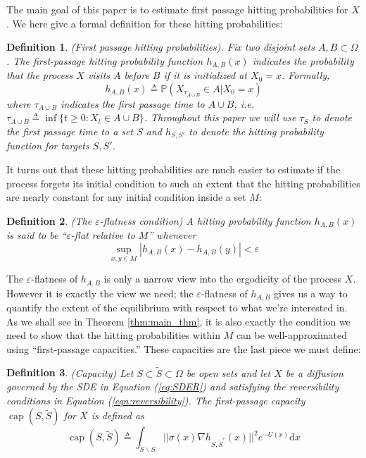 \documentclass[12pt, nofootinbib,english, amsmath, amssymb, aps, priprint, graphicx,floatfix,draft]{revtex4-1}
\newtheorem{definition}{Definition}
\theoremstyle{plain}
\theoremstyle{definition}
\theoremstyle{plain}
\begin{document}
The main goal of this paper is to estimate first passage hitting probabilities for $X$.  We here give a formal definition for these hitting probabilities:

\begin{definition}(First passage hitting probabilities).  Fix two disjoint sets $A,B\subset \Omega$.  The first-passage hitting probability function $h_{A,B}(x)$ indicates the probability that the process $X$ visits $A$ before $B$ if it is initialized at $X_0=x$.  Formally,
\[ h_{A, B}(x) \triangleq \mathbb{P}(X_{\tau_{A\cup B}}\in A|X_0=x)\]
where $\tau_{A\cup B}$ indicates the first passage time to $A\cup B$, i.e.\ $\tau_{A\cup B} \triangleq \inf \{ t \geqslant 0 : X_t \in A \cup B \}$.  Throughout this paper we will use $\tau_S$ to denote the first passage time to a set $S$ and $h_{S,S'}$ to denote the hitting probability function for targets $S,S'$.
\end{definition}

It turns out that these hitting probabilities are much easier to estimate if the process forgets its initial condition to such an extent that the hitting probabilities are nearly constant for any initial condition inside a set $M$:
\begin{definition}(The $\varepsilon$-flatness condition)  A hitting probability function $h_{A,B}(x)$ is said to be
``$\varepsilon$-flat relative to $M$'' whenever
\[
\sup_{x, y \in M} |h_{A,B}(x) - h_{A,B}(y)| < \varepsilon
\]
\end{definition}
The $\varepsilon$-flatness of $h_{A,B}$ is only a narrow view into the ergodicity of the process $X$.  However it is exactly the view we need; the $\varepsilon$-flatness of $h_{A,B}$ gives us a way to quantify the extent of the equilibrium with respect to what we're interested in.  As we shall see in Theorem \ref{thm:main_thm}, it is also exactly the condition we need to show that the hitting probabilities within $M$ can be well-approximated using ``first-passage capacities.''  These capacities are the last piece we must define:

\begin{definition}(Capacity)
Let $S \subset \tilde{S} \subset \Omega$ be open sets and let $X$ be a diffusion governed by the SDE in Equation (\ref{eq:SDER}) and satisfying the reversibility conditions in Equation (\ref{eqn:reversibility}).  The first-passage capacity $\ensuremath{\operatorname{cap}} (S, \tilde{S})$ for $X$ is defined as
%
\[ \ensuremath{\operatorname{cap}} (S, \tilde{S}) \triangleq \int_{\tilde S \backslash S}
||\sigma(x) \nabla h_{S, \tilde{S}^c}(x)||^2 e^{- U(x)} \mathrm{d} x \]
%
\end{definition}
\end{document}
